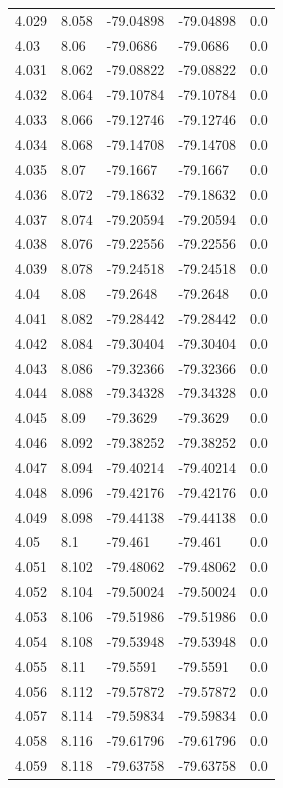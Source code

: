\begin{tabular}{lllll}
4.029 & 8.058 & -79.04898 & -79.04898 & 0.0 \\
4.03 & 8.06 & -79.0686 & -79.0686 & 0.0 \\
4.031 & 8.062 & -79.08822 & -79.08822 & 0.0 \\
4.032 & 8.064 & -79.10784 & -79.10784 & 0.0 \\
4.033 & 8.066 & -79.12746 & -79.12746 & 0.0 \\
4.034 & 8.068 & -79.14708 & -79.14708 & 0.0 \\
4.035 & 8.07 & -79.1667 & -79.1667 & 0.0 \\
4.036 & 8.072 & -79.18632 & -79.18632 & 0.0 \\
4.037 & 8.074 & -79.20594 & -79.20594 & 0.0 \\
4.038 & 8.076 & -79.22556 & -79.22556 & 0.0 \\
4.039 & 8.078 & -79.24518 & -79.24518 & 0.0 \\
4.04 & 8.08 & -79.2648 & -79.2648 & 0.0 \\
4.041 & 8.082 & -79.28442 & -79.28442 & 0.0 \\
4.042 & 8.084 & -79.30404 & -79.30404 & 0.0 \\
4.043 & 8.086 & -79.32366 & -79.32366 & 0.0 \\
4.044 & 8.088 & -79.34328 & -79.34328 & 0.0 \\
4.045 & 8.09 & -79.3629 & -79.3629 & 0.0 \\
4.046 & 8.092 & -79.38252 & -79.38252 & 0.0 \\
4.047 & 8.094 & -79.40214 & -79.40214 & 0.0 \\
4.048 & 8.096 & -79.42176 & -79.42176 & 0.0 \\
4.049 & 8.098 & -79.44138 & -79.44138 & 0.0 \\
4.05 & 8.1 & -79.461 & -79.461 & 0.0 \\
4.051 & 8.102 & -79.48062 & -79.48062 & 0.0 \\
4.052 & 8.104 & -79.50024 & -79.50024 & 0.0 \\
4.053 & 8.106 & -79.51986 & -79.51986 & 0.0 \\
4.054 & 8.108 & -79.53948 & -79.53948 & 0.0 \\
4.055 & 8.11 & -79.5591 & -79.5591 & 0.0 \\
4.056 & 8.112 & -79.57872 & -79.57872 & 0.0 \\
4.057 & 8.114 & -79.59834 & -79.59834 & 0.0 \\
4.058 & 8.116 & -79.61796 & -79.61796 & 0.0 \\
4.059 & 8.118 & -79.63758 & -79.63758 & 0.0 \\

\end{tabular}
